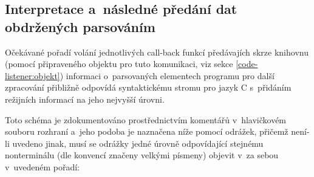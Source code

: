 \subsection{Interpretace a~následné předání dat obdržených parsováním}
%
Očekávané pořadí volání jednotlivých call-back funkcí předávajích
skrze knihovnu (pomocí připraveného objektu pro tuto komunikaci,
viz sekce \ref{code-listener:objekt}) informaci o~parsovaných elementech
programu pro další zpracování přibližně odpovídá syntaktickému stromu
pro jazyk C s~přidáním režijních informací na jeho nejvyšší úrovni.

Toto schéma je zdokumentováno prostřednictvím komentářů v~hlavičkovém
souboru rozhraní a~jeho podoba je naznačena níže pomocí odrážek,
přičemž není-li uvedeno jinak, musí se odrážky jedné úrovně odpovídající
stejnému nonterminálu (dle konvencí značeny velkými písmeny)
objevit v~za sebou v~uvedeném pořadí:

